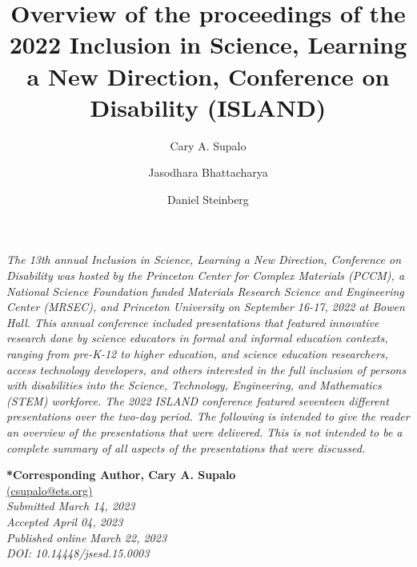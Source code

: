 \documentclass[11.5pt]{sig-alternate}
\makeatletter
\let\oldabstract\abstract
\let\oldendabstract\endabstract
\renewenvironment{abstract}
{\renewenvironment{quotation}%
               {\list{}{\addtolength{\leftmargin}{1em} %
                        \listparindent 1.5em%
                        \itemindent    \listparindent%
                        \rightmargin   \leftmargin%
                        \parsep        \z@ \@plus\p@}%
                \item\relax}%
               {\endlist}%
\oldabstract}
{\oldendabstract}
\makeatother
\begin{document}
\title{Overview of the proceedings of the 2022 Inclusion in Science, Learning a New Direction, Conference on Disability (ISLAND)}

\author[1]{\large \color{blue} Cary A. Supalo}
\author[2]{\large \color{blue} Jasodhara Bhattacharya}
\author[2]{\large \color{blue} Daniel Steinberg}



\toappear{}

\maketitle


\begin{@twocolumnfalse} 

\begin{abstract}
\item 
     \textit{The 13th annual Inclusion in Science, Learning a New Direction, Conference on Disability was hosted by the Princeton Center for Complex Materials (PCCM), a National Science Foundation funded Materials Research Science and Engineering Center (MRSEC), and Princeton University on September 16-17, 2022 at Bowen Hall. This annual conference included presentations that featured innovative research done by science educators in formal and informal education contexts, ranging from pre-K-12 to higher education, and science education researchers, access technology developers, and others interested in the full inclusion of persons with disabilities into the Science, Technology, Engineering, and Mathematics (STEM) workforce. The 2022 ISLAND conference featured seventeen different presentations over the two-day period. The following is intended to give the reader an overview of the presentations that were delivered. This is not intended to be a complete summary of all aspects of the presentations that were discussed.}
    

     
\end{abstract}

\end{@twocolumnfalse}

\textbf{*Corresponding Author, Cary A. Supalo} \\
\href{mailto:mlohmann@ccu.edu}{(csupalo@ets.org)} \\
\textit{Submitted March 14, 2023}\\
\textit{Accepted April 04, 2023} \\
\textit{Published online March 22, 2023} \\
\textit{DOI: 10.14448/jsesd.15.0003} \\
\pagebreak
\pagebreak
\end{document}
